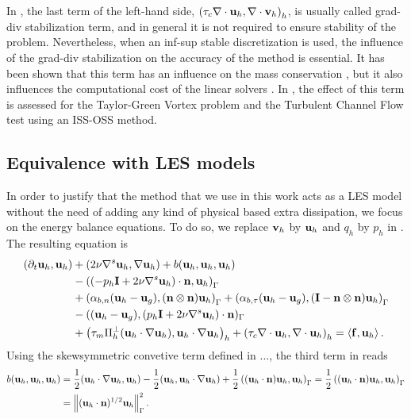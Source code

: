 In , the last term of the left-hand side, $ \left(\tau_c\nabla\cdot{\bf u}_h,\nabla\cdot{\bf v}_h\right)_h $, is usually called grad-div stabilization term, and in general it is not required to ensure stability of the problem. Nevertheless, when an inf-sup stable discretization is used, the influence of the grad-div stabilization on the accuracy of the method is essential. It has been shown that this term has an influence on the mass conservation \cite{linke_collision_2009}, but it also influences the computational cost of the linear solvers \cite{olshanskii_grad-div_2004,heister_efficient_2013}. In , the effect of this term is assessed for the Taylor-Green Vortex problem and the Turbulent Channel Flow test using an ISS-OSS method.

\subsection{Equivalence with LES models}
\label{subsec-C7_tbt_OSS_ISS}
In order to justify that the method that we use in this work acts as a LES model without the need of adding any kind of physical based extra dissipation, we focus on the energy balance equations. To do so, we replace $ {\bf v}_h $ by $ {\bf u}_h $ and $ q_h $ by $ p_h $ in . The resulting equation is
\begin{align}
\label{eq-C7_NS_ene_balance_1}
(\partial_t{\bf u}_h,{\bf u}_h)&+(2\nu\nabla^s{\bf u}_h,\nabla{\bf u}_h)+b({\bf u}_h,{\bf u}_h,{\bf u}_h)\\\nonumber
&-\left((-p_h\mathbf{I}+2\nu\nabla^s{\bf u}_h)\cdot{\bf n},{\bf u}_h\right)_\Gamma\\\nonumber&+\left(\alpha_{b,n}({\bf u}_h-{\bf u}_g),({\bf n}\otimes{\bf n}){\bf u}_h\right)_\Gamma+\left(\alpha_{b,\tau}({\bf u}_h-{\bf u}_g),(\mathbf{I}-{\bf n}\otimes{\bf n}){\bf u}_h\right)_\Gamma\\\nonumber
&-(({\bf u}_h-{\bf u}_g),(p_h\mathbf{I}+2\nu\nabla^s{\bf u}_h)\cdot{\bf n})_\Gamma\\\nonumber
&+\left(\tau_m\Pi_h^\perp({\bf u}_h\cdot\nabla{\bf u}_h),{\bf u}_h\cdot\nabla{\bf u}_h\right)_h+\left(\tau_c\nabla\cdot{\bf u}_h,\nabla\cdot{\bf u}_h\right)_h=\left\langle{\bf f},{\bf u}_h\right\rangle.
\end{align}
Using the skewsymmetric convetive term defined in ..., the third term in  reads
\begin{align*}
b({\bf u}_h,{\bf u}_h,{\bf u}_h)&=\frac{1}{2}({\bf u}_h\cdot\nabla{\bf u}_h,{\bf u}_h)-\frac{1}{2}({\bf u}_h,{\bf u}_h\cdot\nabla{\bf u}_h)+\frac{1}{2}\left(({\bf u}_h\cdot{\bf n}){\bf u}_h,{\bf u}_h\right)_\Gamma=\frac{1}{2}\left(({\bf u}_h\cdot{\bf n}){\bf u}_h,{\bf u}_h\right)_\Gamma\\
&=\left\|({\bf u}_h\cdot{\bf n})^{1/2}{\bf u}_h\right\|^2_\Gamma.
\end{align*}
